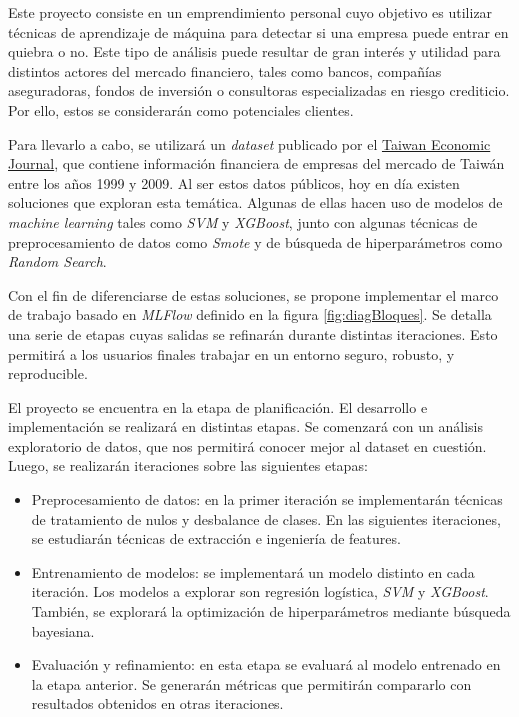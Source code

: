 \documentclass[
11pt, %
]{charter}
\begin{document}
Este proyecto consiste en un emprendimiento personal cuyo objetivo es utilizar técnicas de aprendizaje de máquina para detectar si una empresa puede entrar en quiebra o no. Este tipo de análisis puede resultar de gran interés y utilidad para distintos actores del mercado financiero, tales como bancos, compañías aseguradoras, fondos de inversión o consultoras especializadas en riesgo crediticio. Por ello, estos se considerarán como potenciales clientes.

Para llevarlo a cabo, se utilizará un \textit{dataset} publicado por el \href{https://www.tejwin.com/en/}{Taiwan Economic Journal}, que contiene información financiera de empresas del mercado de Taiwán entre los años 1999 y 2009. Al ser estos datos públicos, hoy en día existen soluciones que exploran esta temática. Algunas de ellas hacen uso de modelos de \textit{machine learning} tales como \textit{SVM} y \textit{XGBoost}, junto con algunas técnicas de preprocesamiento de datos como \textit{Smote} y de búsqueda de hiperparámetros como \textit{Random Search}.

Con el fin de diferenciarse de estas soluciones, se propone implementar el marco de trabajo basado en \textit{MLFlow} definido en la figura \ref{fig:diagBloques}. Se detalla una serie de etapas cuyas salidas se refinarán durante distintas iteraciones. Esto permitirá a los usuarios finales trabajar en un entorno seguro, robusto, y reproducible.

El proyecto se encuentra en la etapa de planificación. El desarrollo e implementación se realizará en distintas etapas. Se comenzará con un análisis exploratorio de datos, que nos permitirá conocer mejor al dataset en cuestión. Luego, se realizarán iteraciones sobre las siguientes etapas:

\begin{itemize}
	\item Preprocesamiento de datos: en la primer iteración se implementarán técnicas de tratamiento de nulos y desbalance de clases. En las siguientes iteraciones, se estudiarán técnicas de extracción e ingeniería de features.
	\item Entrenamiento de modelos: se implementará un modelo distinto en cada iteración. Los modelos a explorar son regresión logística, \textit{SVM} y \textit{XGBoost}. También, se explorará la optimización de hiperparámetros mediante búsqueda bayesiana.
	\item Evaluación y refinamiento: en esta etapa se evaluará al modelo entrenado en la etapa anterior. Se generarán métricas que permitirán compararlo con resultados obtenidos en otras iteraciones.
\end{itemize}
\end{document}
